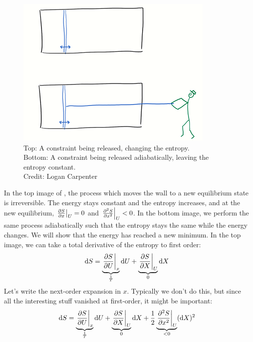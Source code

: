 \documentclass[a4paper,twoside,master.tex]{subfiles}
\begin{document}

\begin{figure}[h]
    \centering
    \includegraphics[width=\textwidth]{figures/lec_19_piston.png}
    \caption{Top: A constraint being released, changing the entropy.\\Bottom: A constraint being released adiabatically, leaving the entropy constant.\\Credit: Logan Carpenter}
    \label{fig:lec_19_piston}
\end{figure}

In the top image of , the process which moves the wall to a new equilibrium state is irreversible. The energy stays constant and the entropy increases, and at the new equilibrium, $ \eval{\pdv{S}{x}}_{U} = 0 $ and $ \eval{\pdv[2]{S}{x}}_{U} < 0 $. In the bottom image, we perform the same process adiabatically such that the entropy stays the same while the energy changes. We will show that the energy has reached a new minimum. In the top image, we can take a total derivative of the entropy to first order:
\begin{equation}
    \dd{S} = \underbrace{\eval{\pdv{S}{U}}_{x}}_{\frac{1}{T}} \dd{U} + \underbrace{\eval{\pdv{S}{X}}_{U}}_{0} \dd{X}
\end{equation}
Let's write the next-order expansion in $ x $. Typically we don't do this, but since all the interesting stuff vanished at first-order, it might be important:
\begin{equation}
    \dd{S} = \underbrace{\eval{\pdv{S}{U}}_{x}}_{\frac{1}{T}} \dd{U} + \underbrace{\eval{\pdv{S}{X}}_{U}}_{0} \dd{X} + \frac{1}{2} \underbrace{\eval{\pdv[2]{S}{x}}_{U}}_{<0} (\dd{X})^2
\end{equation}
\end{document}
